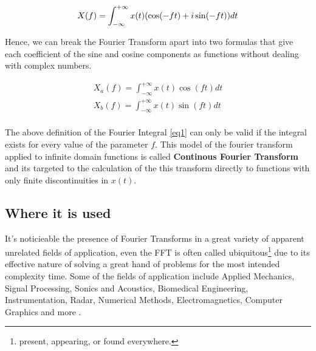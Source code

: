 \documentclass[
  oneside,
  11pt, a4paper,
  footinclude=true,
  headinclude=true,
  cleardoublepage=empty
]{scrbook}
\begin{document}
\begin{equation}
    X(f) = \int_{-\infty}^{+\infty} x(t) (\cos (-f t) + i \sin (-f t)) dt \\
\end{equation}

Hence, we can break the Fourier Transform apart into two formulas that give each coefficient of the sine and cosine components as functions without dealing with complex numbers.

\begin{equation}
    \begin{split}
        X_{a}(f) = \int_{-\infty}^{+\infty} x(t) \cos (f t) dt \\
        X_{b}(f) = \int_{-\infty}^{+\infty} x(t) \sin (f t) dt \\
    \end{split}
\end{equation}




The above definition of the Fourier Integral \autoref{eq1} can only be valid if the integral exists for every value of the parameter \(f\). This model of the fourier transform applied to infinite domain functions is called \textbf{Continous Fourier Transform} and its targeted to the calculation of the this transform directly to functions with only finite discontinuities in \( x(t) \).

\subsection{Where it is used} \label{subsec:where-it-is-used}

It's noticieable the presence of Fourier Transforms in a great variety of apparent unrelated fields of application, even the FFT is often called ubiquitous\footnote{present, appearing, or found everywhere.} due to its effective nature of solving a great hand of problems for the most intended complexity time. Some of the fields of application include Applied Mechanics, Signal Processing, Sonics and Acoustics, Biomedical Engineering, Instrumentation, Radar, Numerical Methods, Electromagnetics, Computer Graphics and more \cite{brigham1988fast}. %
\end{document}
